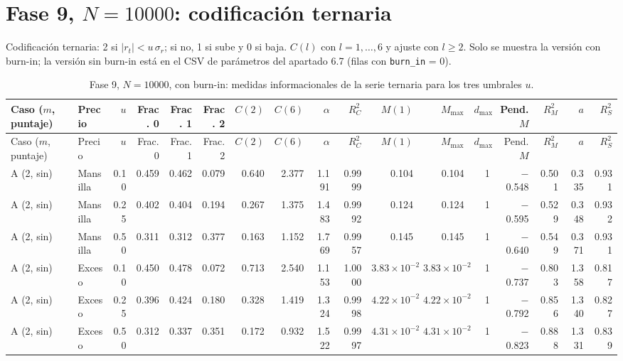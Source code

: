 \documentclass[11pt,letterpaper]{article}
\begin{document}
\section{Fase 9, $N=10000$: codificación ternaria}\label{ap:ternaria}
\begin{landscape}
Codificación ternaria: 2 si $|r_t|<u\,\sigma_r$; si no, 1 si sube y 0 si baja. $C(l)$ con $l=1,\dots,6$ y ajuste con $l\ge 2$. Solo se muestra la versión con burn-in; la versión sin burn-in está en el CSV de parámetros del apartado 6.7 (filas con \texttt{burn\_in} = 0).

\begin{scriptsize}
\setlength{\tabcolsep}{3pt}
\begin{longtable}{llrrrrrrrrrrrrrrr}
\caption{Fase 9, $N=10000$, con burn-in: medidas informacionales de la serie ternaria para los tres umbrales $u$.}\label{tab:f9ter}\\
\toprule
Caso ($m$, puntaje) & Precio & $u$ & Frac. 0 & Frac. 1 & Frac. 2 & $C(2)$ & $C(6)$ & $\alpha$ & $R^2_C$ & $M(1)$ & $M_{\max}$ & $d_{\max}$ & Pend. $M$ & $R^2_M$ & $a$ & $R^2_S$ \\
\midrule
\endfirsthead
\toprule
Caso ($m$, puntaje) & Precio & $u$ & Frac. 0 & Frac. 1 & Frac. 2 & $C(2)$ & $C(6)$ & $\alpha$ & $R^2_C$ & $M(1)$ & $M_{\max}$ & $d_{\max}$ & Pend. $M$ & $R^2_M$ & $a$ & $R^2_S$ \\
\midrule
\endhead
\bottomrule
\endfoot
A (2, sin) & Mansilla & 0.10 & 0.459 & 0.462 & 0.079 & 0.640 & 2.377 & 1.191 & 0.9999 & 0.104 & 0.104 & 1 & $-$0.548 & 0.501 & 0.335 & 0.931 \\
A (2, sin) & Mansilla & 0.25 & 0.402 & 0.404 & 0.194 & 0.267 & 1.375 & 1.483 & 0.9992 & 0.124 & 0.124 & 1 & $-$0.595 & 0.529 & 0.348 & 0.932 \\
A (2, sin) & Mansilla & 0.50 & 0.311 & 0.312 & 0.377 & 0.163 & 1.152 & 1.769 & 0.9957 & 0.145 & 0.145 & 1 & $-$0.640 & 0.549 & 0.371 & 0.931 \\
A (2, sin) & Exceso & 0.10 & 0.450 & 0.478 & 0.072 & 0.713 & 2.540 & 1.153 & 1.0000 & $3.83\times10^{-2}$ & $3.83\times10^{-2}$ & 1 & $-$0.737 & 0.803 & 1.358 & 0.817 \\
A (2, sin) & Exceso & 0.25 & 0.396 & 0.424 & 0.180 & 0.328 & 1.419 & 1.324 & 0.9998 & $4.22\times10^{-2}$ & $4.22\times10^{-2}$ & 1 & $-$0.792 & 0.856 & 1.340 & 0.827 \\
A (2, sin) & Exceso & 0.50 & 0.312 & 0.337 & 0.351 & 0.172 & 0.932 & 1.522 & 0.9997 & $4.31\times10^{-2}$ & $4.31\times10^{-2}$ & 1 & $-$0.823 & 0.888 & 1.331 & 0.839 \\

\end{longtable}
\end{scriptsize}
\end{landscape}
\end{document}
